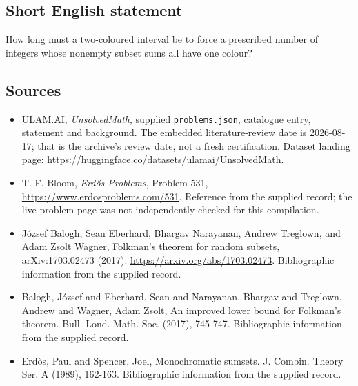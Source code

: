 \documentclass[11pt,a4paper]{article}
\begin{document}
\subsection{Short English statement}

How long must a two-coloured interval be to force a prescribed number of integers whose nonempty subset sums all have one colour?

\subsection{Sources}

{\small

\begin{itemize}

\item[\hypertarget{source:statement:1}{S1}] ULAM.AI, \emph{UnsolvedMath}, supplied \texttt{problems.json}, catalogue entry, statement and background. The embedded literature-review date is 2026-08-17; that is the archive’s review date, not a fresh certification. Dataset landing page: \url{https://huggingface.co/datasets/ulamai/UnsolvedMath}.

\item[\hypertarget{source:statement:2}{S2}] T. F. Bloom, \emph{Erdős Problems}, Problem 531, \url{https://www.erdosproblems.com/531}. Reference from the supplied record; the live problem page was not independently checked for this compilation.

\item[\hypertarget{source:statement:3}{S3}] József Balogh, Sean Eberhard, Bhargav Narayanan, Andrew Treglown, and Adam Zsolt Wagner, Folkman's theorem for random subsets, arXiv:1703.02473 (2017). \url{https://arxiv.org/abs/1703.02473}. Bibliographic information from the supplied record.

\item[\hypertarget{source:statement:4}{S4}] Balogh, J\'{o}zsef and Eberhard, Sean and Narayanan, Bhargav and Treglown, Andrew and Wagner, Adam Zsolt, An improved lower bound for Folkman's theorem. Bull. Lond. Math. Soc. (2017), 745-747. Bibliographic information from the supplied record.

\item[\hypertarget{source:statement:5}{S5}] Erd\H{o}s, Paul and Spencer, Joel, Monochromatic sumsets. J. Combin. Theory Ser. A (1989), 162-163. Bibliographic information from the supplied record.

\end{itemize}

}

\label{end:statement}
\end{document}
